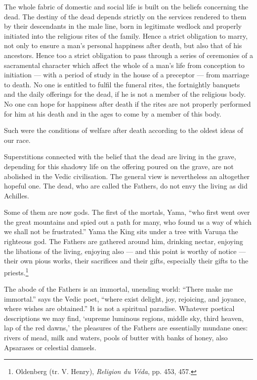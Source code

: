 \documentclass[a4paper, 11pt, oneside, english]{article}
\begin{document}
The whole fabric of domestic and social life is built on the beliefs concerning the dead. The destiny of the dead depends strictly on the services rendered to them by their descendants in the male line, born in legitimate wedlock and properly initiated into the religious rites of the family. Hence a strict obligation to marry, not only to ensure a man's personal happiness after death, but also that of his ancestors. Hence too a strict obligation to pass through a series of ceremonies of a sacramental character which affect the whole of a man's life from conception to initiation --- with a period of study in the house of a preceptor --- from marriage to death. No one is entitled to fulfil the funeral rites, the fortnightly banquets and the daily offerings for the dead, if he is not a member of the religious body. No one can hope for happiness after death if the rites are not properly performed for him at his death and in the ages to come by a member of this body.

Such were the conditions of welfare after death according to the oldest ideas of our race.

Superstitions connected with the belief that the dead are living in the grave, depending for this shadowy life on the offering poured on the grave, are not abolished in the Vedic civilisation. The general view is nevertheless an altogether hopeful one. The dead, who are called the Fathers, do not envy the living as did Achilles.

Some of them are now gods. The first of the mortals, Yama, ``who first went over the great mountains and spied out a path for many, who found us a way of which we shall not be frustrated.'' Yama the King sits under a tree with Varuṇa the righteous god. The Fathers are gathered around him, drinking nectar, enjoying the libations of the living, enjoying also --- and this point is worthy of notice --- their own pious works, their sacrifices and their gifts, especially their gifts to the priests.\footnote{Oldenberg (tr. V. Henry), \emph{Religion du Véda}, pp. 453, 457.}

The abode of the Fathers is an immortal, unending world: ``There make me immortal.'' says the Vedic poet, ``where exist delight, joy, rejoicing, and joyance, where wishes are obtained.'' It is not a spiritual paradise. Whatever poetical descriptions we may find, `supreme luminous regions, middle sky, third heaven, lap of the red dawns,' the pleasures of the Fathers are essentially mundane ones: rivers of mead, milk and waters, pools of butter with banks of honey, also Apsarases or celestial damsels.
\end{document}
